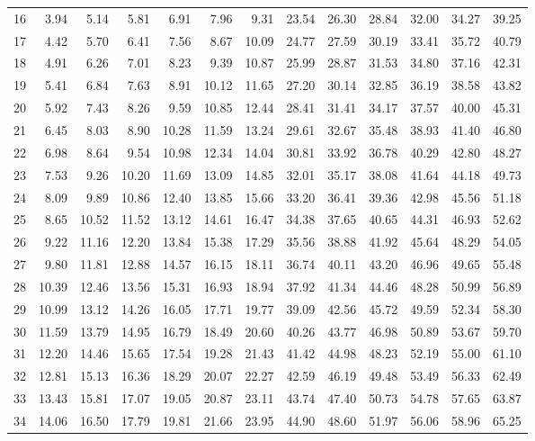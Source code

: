 \documentclass[captions=tableheading, 12pt, headings=small, parskip=half]{scrartcl}
\begin{document}
\begin{table}[ht]
{\begin{tabular}{rd{2.3}d{2.3}d{2.3}d{2.3}d{2.3}d{2.3}d{2.3}d{2.3}d{2.3}d{2.3}d{2.3}d{2.3}}
		16 & 3.94 & 5.14 & 5.81 & 6.91 & 7.96 & 9.31 & 23.54 & 26.30 & 28.84 & 32.00 & 34.27 & 39.25 \\ 
		17 & 4.42 & 5.70 & 6.41 & 7.56 & 8.67 & 10.09 & 24.77 & 27.59 & 30.19 & 33.41 & 35.72 & 40.79 \\ 
		18 & 4.91 & 6.26 & 7.01 & 8.23 & 9.39 & 10.87 & 25.99 & 28.87 & 31.53 & 34.80 & 37.16 & 42.31 \\ 
		19 & 5.41 & 6.84 & 7.63 & 8.91 & 10.12 & 11.65 & 27.20 & 30.14 & 32.85 & 36.19 & 38.58 & 43.82 \\ 
		20 & 5.92 & 7.43 & 8.26 & 9.59 & 10.85 & 12.44 & 28.41 & 31.41 & 34.17 & 37.57 & 40.00 & 45.31 \\ 
		21 & 6.45 & 8.03 & 8.90 & 10.28 & 11.59 & 13.24 & 29.61 & 32.67 & 35.48 & 38.93 & 41.40 & 46.80 \\ 
		22 & 6.98 & 8.64 & 9.54 & 10.98 & 12.34 & 14.04 & 30.81 & 33.92 & 36.78 & 40.29 & 42.80 & 48.27 \\ 
		23 & 7.53 & 9.26 & 10.20 & 11.69 & 13.09 & 14.85 & 32.01 & 35.17 & 38.08 & 41.64 & 44.18 & 49.73 \\ 
		24 & 8.09 & 9.89 & 10.86 & 12.40 & 13.85 & 15.66 & 33.20 & 36.41 & 39.36 & 42.98 & 45.56 & 51.18 \\ 
		25 & 8.65 & 10.52 & 11.52 & 13.12 & 14.61 & 16.47 & 34.38 & 37.65 & 40.65 & 44.31 & 46.93 & 52.62 \\ 
		26 & 9.22 & 11.16 & 12.20 & 13.84 & 15.38 & 17.29 & 35.56 & 38.88 & 41.92 & 45.64 & 48.29 & 54.05 \\ 
		27 & 9.80 & 11.81 & 12.88 & 14.57 & 16.15 & 18.11 & 36.74 & 40.11 & 43.20 & 46.96 & 49.65 & 55.48 \\ 
		28 & 10.39 & 12.46 & 13.56 & 15.31 & 16.93 & 18.94 & 37.92 & 41.34 & 44.46 & 48.28 & 50.99 & 56.89 \\ 
		29 & 10.99 & 13.12 & 14.26 & 16.05 & 17.71 & 19.77 & 39.09 & 42.56 & 45.72 & 49.59 & 52.34 & 58.30 \\ 
		30 & 11.59 & 13.79 & 14.95 & 16.79 & 18.49 & 20.60 & 40.26 & 43.77 & 46.98 & 50.89 & 53.67 & 59.70 \\ 
		31 & 12.20 & 14.46 & 15.65 & 17.54 & 19.28 & 21.43 & 41.42 & 44.98 & 48.23 & 52.19 & 55.00 & 61.10 \\ 
		32 & 12.81 & 15.13 & 16.36 & 18.29 & 20.07 & 22.27 & 42.59 & 46.19 & 49.48 & 53.49 & 56.33 & 62.49 \\ 
		33 & 13.43 & 15.81 & 17.07 & 19.05 & 20.87 & 23.11 & 43.74 & 47.40 & 50.73 & 54.78 & 57.65 & 63.87 \\ 
		34 & 14.06 & 16.50 & 17.79 & 19.81 & 21.66 & 23.95 & 44.90 & 48.60 & 51.97 & 56.06 & 58.96 & 65.25 \\ 

\end{tabular}}
\end{table}
\end{document}
